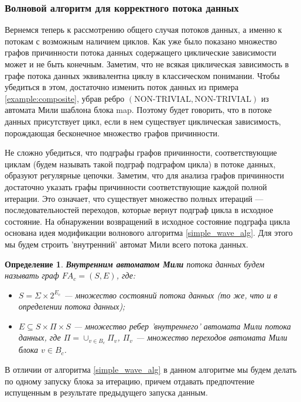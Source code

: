 \documentclass[10pt,a4paper]{article}
\newtheorem{defen}{Определение}
\newcommand{\nontrivial}{\text{NON-TRIVIAL}}
\newcommand{\FA}{F\!A}
\begin{document}
\subsubsection{Волновой алгоритм для корректного потока данных}
  Вернемся теперь к рассмотрению общего случая потоков данных, а именно к потокам с возможным наличием циклов.
  Как уже было показано множество графов причинности потока данных содержащего циклические зависимости может и не быть конечным.
  Заметим, что не всякая циклическая зависимость в графе потока данных эквивалентна циклу в классическом понимании.
  Чтобы убедиться в этом, достаточно изменить поток данных из примера \ref{example:composite},
  убрав ребро $(\nontrivial, \nontrivial)$ из автомата Мили шаблона блока map.
  Поэтому будет говорить, что в потоке данных присутствует цикл, если в нем существует циклическая зависимость, порождающая бесконечное множество графов причинности.
  
  Не сложно убедиться, что подграфы графов причинности, соответствующие циклам (будем называть такой подграф подграфом цикла) в потоке данных, образуют регулярные цепочки.
  Заметим, что для анализа графов причинности достаточно указать графы причинности соответствующие каждой полной итерации.
  Это означает, что существует множество полных итераций --- последовательностей переходов, которые вернут подграф цикла в исходное состояние.
  На обнаружении возвращений в исходное состояние подграфа цикла основана идея модификации волнового алгоритма \ref{simple_wave_alg}.
  Для этого мы будем строить 'внутренний' автомат Мили всего потока данных.
  
  \begin{defen}
    \textbf{Внутренним автоматом Мили} потока данных будем называть граф $\FA_c = (S, E)$, где:
    \begin{itemize}
      \item $S = \Sigma \times 2^{E_c}$ --- множество состояний потока данных (то же, что и в определении потока данных);
      \item $E \subseteq S \times \Pi \times S$ --- множество ребер 'внутреннего' автомата Мили потока данных,
        где $\Pi = \cup_{v \in B_c} \Pi_v$, $\Pi_v$ --- множество переходов автомата Мили блока $v \in B_c$.
    \end{itemize}
  \end{defen}
  
  В отличии от алгоритма \ref{simple_wave_alg} в данном алгоритме мы будем делать по одному запуску блока за итерацию, причем отдавать предпочтение
  испущенным в результате предыдущего запуска данным.
  
\end{document}
